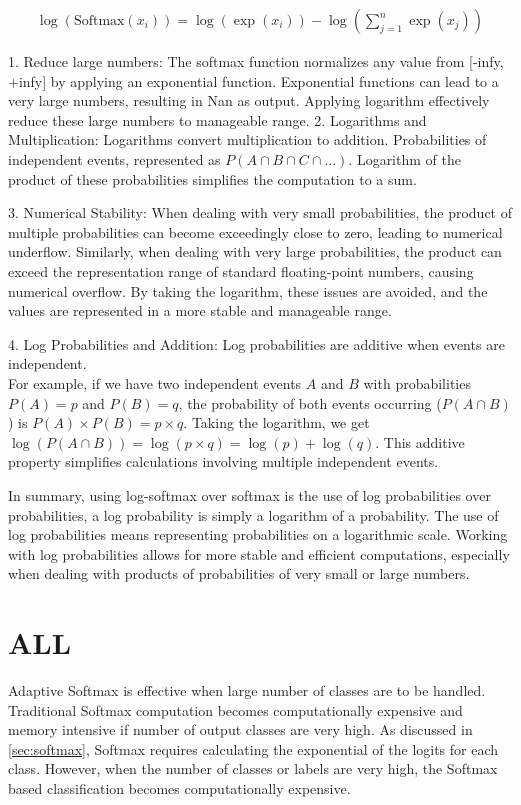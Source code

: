 \begin{align}
    \log(\text{Softmax}(x_i)) = \log(\exp(x_i)) - \log\left(\sum_{j=1}^n \exp(x_j)\right)
\end{align}

1. Reduce large numbers:  The softmax function normalizes any value from [-infy, +infy] by applying an exponential function. Exponential functions can lead to a very large numbers, resulting in  Nan as output. Applying logarithm effectively reduce these large numbers to manageable range.
2. Logarithms and Multiplication: Logarithms convert multiplication to addition. Probabilities of independent events,  represented as \(P(A \cap B \cap C \cap \ldots)\). Logarithm of the product of these probabilities simplifies the computation to a sum. 

3. Numerical Stability: When dealing with very small probabilities, the product of multiple probabilities can become exceedingly close to zero, leading to numerical underflow. Similarly, when dealing with very large probabilities, the product can exceed the representation range of standard floating-point numbers, causing numerical overflow. By taking the logarithm, these issues are avoided, and the values are represented in a more stable and manageable range.

4. Log Probabilities and Addition: Log probabilities are additive when events are independent.\\ For example, if we have two independent events \(A\) and \(B\) with probabilities \(P(A) = p\) and \(P(B) = q\), the probability of both events occurring (\(P(A \cap B)\)) is \(P(A) \times P(B) = p \times q\). Taking the logarithm, we get \(\log(P(A \cap B)) = \log(p \times q) = \log(p) + \log(q)\). This additive property simplifies calculations involving multiple independent events.

In summary, using log-softmax over softmax is the use of log probabilities over probabilities, a log probability is simply a logarithm of a probability. The use of log probabilities means representing probabilities on a logarithmic scale. Working with log probabilities allows for more stable and efficient computations, especially when dealing with products of probabilities of very small or large numbers. 


\section{\acf{ALL}}

Adaptive Softmax \parencite{Grave.14092016} is effective when large number of classes are to be handled. Traditional Softmax computation becomes computationally expensive and memory intensive if number of output classes are very high. As discussed in  \ref{sec:softmax}, Softmax requires calculating the exponential of the logits for each class. However, when the number of classes or labels are very high, the Softmax based classification becomes computationally expensive.



